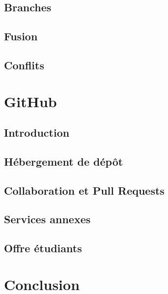 \documentclass[11pt,a4paper]{article}
\begin{document}
\subsection{Branches}

\subsection{Fusion}

\subsection{Conflits}

\section{GitHub}

\subsection{Introduction}

\subsection{Hébergement de dépôt}

\subsection{Collaboration et Pull Requests}

\subsection{Services annexes}

\subsection{Offre étudiants}

\section{Conclusion}
\end{document}
